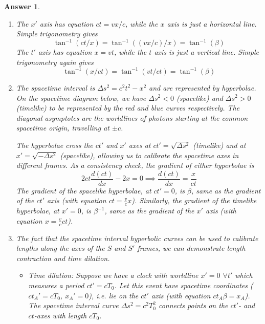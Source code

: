 \documentclass[a4paper]{article}
\theoremstyle{new2}
\newtheorem{ans}{Answer}[section]
\theoremstyle{new}
\begin{document}
\begin{ans}\leavevmode
\begin{enumerate}[label=(\alph*)]
\item The $x'$ axis has equation $ct=vx/c$, while the $x$ axis is just a horizontal line. Simple trigonometry gives
$$\tan^{-1}(ct/x)=\tan^{-1}((vx/c)/x)=\tan^{-1}(\beta)$$
The $t'$ axis has equation $x=vt$, while the $t$ axis is just a vertical line. Simple trigonometry again gives
$$\tan^{-1}(x/ct)=\tan^{-1}(vt/ct)=\tan^{-1}(\beta)$$
\item The spacetime interval is $\Delta s^2=c^2t^2-x^2$ and are represented by hyperbolae. On the spacetime diagram below, we have $\Delta s^2<0$ (spacelike) and $\Delta s^2>0$ (timelike) to be represented by the red and blue curves respectively. The diagonal asymptotes are the worldlines of photons starting at the common spacetime origin, travelling at $\pm c$.
\begin{center}
\end{center}
The hyperbolae cross the $ct'$ and $x'$ axes at $ct'=\sqrt{\Delta s^2}$ (timelike) and at $x'=\sqrt{-\Delta s^2}$ (spacelike), allowing us to calibrate the spacetime axes in different frames. As a consistency check, the gradient of either hyperbolae is
$$2ct\frac{d(ct)}{dx}-2x=0\implies\frac{d(ct)}{dx}=\frac{x}{ct}$$
The gradient of the spacelike hyperbolae, at $ct'=0$, is $\beta$, same as the gradient of the $ct'$ axis (with equation $ct=\frac{v}{c}x$). Similarly, the gradient of the timelike hyperbolae, at $x'=0$, is $\beta^{-1}$, same as the gradient of the $x'$ axis (with equation $x=\frac{v}{c}ct$).
\item The fact that the spacetime interval hyperbolic curves can be used to calibrate lengths along the axes of the $S$ and $S'$ frames, we can demonstrate length contraction and time dilation. 
\begin{itemize}
    \item Time dilation: Suppose we have a clock with worldline $x'=0$ $\forall t'$ which measures a period $ct'=cT_0$. Let this event have spacetime coordinates ($ct_A'=cT_0$, $x_A'=0$), i.e. lie on the $ct'$ axis (with equation $ct_A\beta=x_A$). The spacetime interval curve $\Delta s^2=c^2T_0^2$ connects points on the $ct'$- and $ct$-axes with length $cT_0$. 

\end{itemize}
\end{enumerate}
\end{ans}
\end{document}
